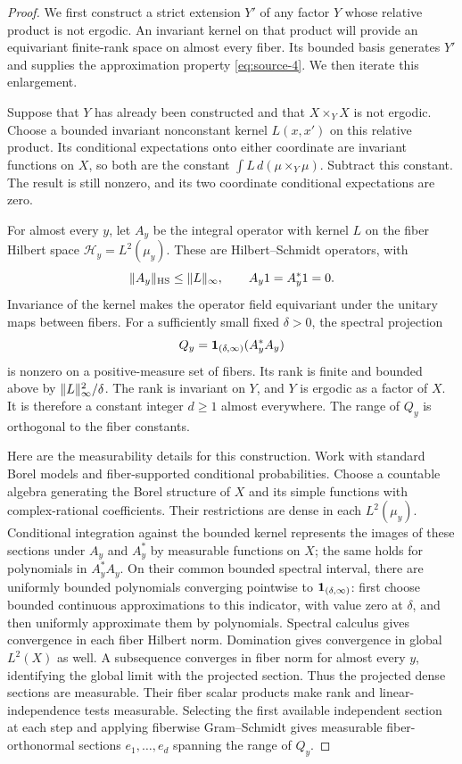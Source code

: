 \begin{proof}
We first construct a strict extension $Y'$ of any factor $Y$ whose
relative product is not ergodic.  An invariant kernel on that product
will provide an equivariant finite-rank space on almost every fiber.  Its
bounded basis generates $Y'$ and supplies the approximation property
\eqref{eq:source-4}.  We then iterate this enlargement.

Suppose that $Y$ has already been constructed and that $X\times_YX$ is
not ergodic.  Choose a bounded invariant nonconstant kernel $L(x,x')$
on this relative product.  Its conditional expectations onto either
coordinate are invariant functions on $X$, so both are the constant
$\int L\,d(\mu\mathbin{\times_Y}\mu)$.  Subtract this constant.  The
result is still nonzero, and its two coordinate conditional expectations
are zero.

For almost every $y$, let $A_y$ be the integral operator with kernel
$L$ on the fiber Hilbert space $\mathcal H_y=L^2(\mu_y)$.  These are
Hilbert--Schmidt operators, with
\[
 \lVert A_y\rVert_{\mathrm{HS}}\leq\lVert L\rVert_\infty,
 \qquad A_y1=A_y^*1=0.
\]
Invariance of the kernel makes the operator field equivariant under the
unitary maps between fibers.  For a sufficiently small fixed $\delta>0$,
the spectral projection
\[
 Q_y=\mathbf 1_{(\delta,\infty)}(A_y^*A_y)
\]
is nonzero on a positive-measure set of fibers.  Its rank is finite and
bounded above by $\lVert L\rVert_\infty^2/\delta$.  The rank is invariant on
$Y$, and $Y$ is ergodic as a factor of $X$.  It is therefore a constant
integer $d\geq1$ almost everywhere.  The range of $Q_y$ is orthogonal
to the fiber constants.

Here are the measurability details for this construction.  Work with
standard Borel models and fiber-supported conditional probabilities.
Choose a countable algebra generating the Borel structure of $X$ and
its simple functions with complex-rational coefficients.  Their
restrictions are dense in each $L^2(\mu_y)$.  Conditional integration
against the bounded kernel represents the images of these sections under
$A_y$ and $A_y^*$ by measurable functions on $X$; the same holds for
polynomials in $A_y^*A_y$.  On their common bounded spectral interval,
there are uniformly bounded polynomials converging pointwise to
$\mathbf 1_{(\delta,\infty)}$: first choose bounded continuous approximations
to this indicator, with value zero at $\delta$, and then uniformly
approximate them by polynomials.  Spectral calculus gives convergence
in each fiber Hilbert norm.  Domination gives convergence in global
$L^2(X)$ as well.  A subsequence converges in fiber norm for almost every
$y$, identifying the global limit with the projected section.  Thus the
projected dense sections are measurable.  Their fiber scalar products
make rank and linear-independence tests measurable.  Selecting the first
available independent section at each step and applying fiberwise
Gram--Schmidt gives measurable fiber-orthonormal sections
$e_1,\ldots,e_d$ spanning the range of $Q_y$.


\end{proof}
